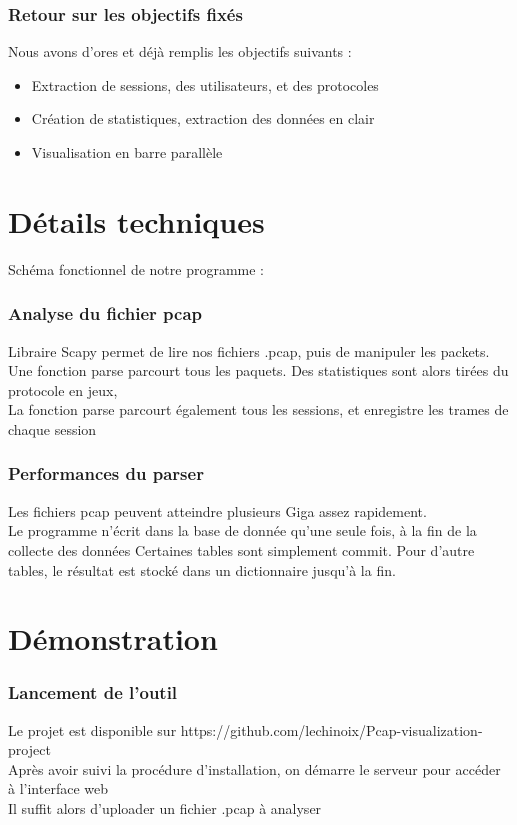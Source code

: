 \documentclass{beamer}
\begin{document}
  \begin{frame}
  \frametitle{Retour sur les objectifs fixés}
    Nous avons d'ores et déjà remplis les objectifs suivants :
    \begin{itemize}
     \item Extraction de sessions, des utilisateurs, et des protocoles
     \item Création de statistiques, extraction des données en clair
     \item Visualisation en barre parallèle
    \end{itemize}
  \end{frame}
  
  \section{Détails techniques}
  \begin{frame}
   Schéma fonctionnel de notre programme :
  \end{frame}
  \begin{frame}
    \frametitle{Analyse du fichier pcap}
    Libraire Scapy permet de lire nos fichiers .pcap, puis de manipuler les packets.\\
    Une fonction parse parcourt tous les paquets. Des statistiques sont alors tirées du protocole en jeux, \\
    La fonction parse parcourt également tous les sessions, et enregistre les trames de chaque session\\
  \end{frame}
  
  \begin{frame}
    \frametitle{Performances du parser}
    Les fichiers pcap peuvent atteindre plusieurs Giga assez rapidement. \\
    Le programme n'écrit dans la base de donnée qu'une seule fois, à la fin de la collecte des données
    Certaines tables sont simplement commit. Pour d'autre tables, le résultat est stocké dans un dictionnaire jusqu'à la fin.
  \end{frame}
  



  
 \section{Démonstration}
  \begin{frame}
    \frametitle{Lancement de l'outil}
    Le projet est disponible sur https://github.com/lechinoix/Pcap-visualization-project  \\
    Après avoir suivi la procédure d'installation, on démarre le serveur pour accéder à l'interface web \\
    Il suffit alors d'uploader un fichier .pcap à analyser
  \end{frame}
\end{document}
